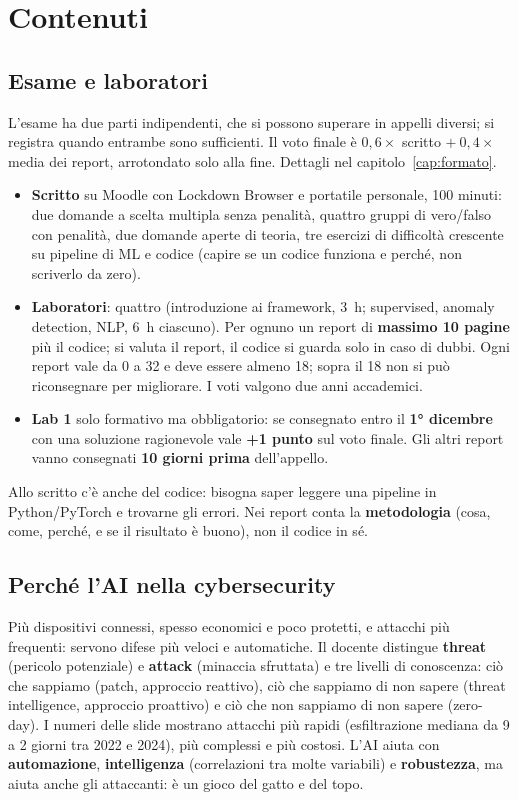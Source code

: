\section{Contenuti}

\subsection{Esame e laboratori}
L'esame ha due parti indipendenti, che si possono superare in appelli diversi; si registra quando
entrambe sono sufficienti. Il voto finale è $0{,}6 \times$ scritto $+\ 0{,}4 \times$ media dei report,
arrotondato solo alla fine. Dettagli nel capitolo~\ref{cap:formato}.
\begin{itemize}
  \item \textbf{Scritto} su Moodle con Lockdown Browser e portatile personale, 100 minuti: due
    domande a scelta multipla senza penalità, quattro gruppi di vero/falso con penalità, due domande
    aperte di teoria, tre esercizi di difficoltà crescente su pipeline di ML e codice (capire se un
    codice funziona e perché, non scriverlo da zero).
  \item \textbf{Laboratori}: quattro (introduzione ai framework, 3~h; supervised, anomaly detection,
    NLP, 6~h ciascuno). Per ognuno un report di \textbf{massimo 10 pagine} più il codice; si valuta il
    report, il codice si guarda solo in caso di dubbi. Ogni report vale da 0 a 32 e deve essere
    almeno 18; sopra il 18 non si può riconsegnare per migliorare. I voti valgono due anni
    accademici.
  \item \textbf{Lab 1} solo formativo ma obbligatorio: se consegnato entro il \textbf{1° dicembre}
    con una soluzione ragionevole vale \textbf{+1 punto} sul voto finale. Gli altri report vanno
    consegnati \textbf{10 giorni prima} dell'appello.
\end{itemize}

\begin{esame}
Allo scritto c'è anche del codice: bisogna saper leggere una pipeline in Python/PyTorch e trovarne
gli errori. Nei report conta la \textbf{metodologia} (cosa, come, perché, e se il risultato è buono),
non il codice in sé.
\end{esame}

\subsection{Perché l'AI nella cybersecurity}
Più dispositivi connessi, spesso economici e poco protetti, e attacchi più frequenti: servono difese
più veloci e automatiche. Il docente distingue \textbf{threat} (pericolo potenziale) e
\textbf{attack} (minaccia sfruttata) e tre livelli di conoscenza: ciò che sappiamo (patch, approccio
reattivo), ciò che sappiamo di non sapere (threat intelligence, approccio proattivo) e ciò che non
sappiamo di non sapere (zero-day). I numeri delle slide mostrano attacchi più rapidi (esfiltrazione
mediana da 9 a 2 giorni tra 2022 e 2024), più complessi e più costosi. L'AI aiuta con
\textbf{automazione}, \textbf{intelligenza} (correlazioni tra molte variabili) e \textbf{robustezza},
ma aiuta anche gli attaccanti: è un gioco del gatto e del topo.

